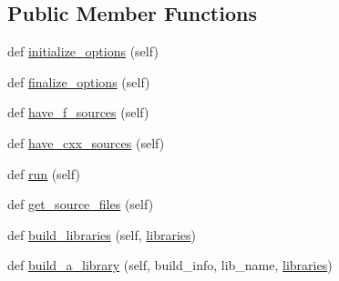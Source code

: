 \subsection*{Public Member Functions}
\begin{DoxyCompactItemize}
\item 
def \hyperlink{classnumpy_1_1distutils_1_1command_1_1build__clib_1_1build__clib_a8d47e29698065ed23a5546e06f7e142c}{initialize\+\_\+options} (self)
\item 
def \hyperlink{classnumpy_1_1distutils_1_1command_1_1build__clib_1_1build__clib_a68ebd0021cfc302004eefb0263ce0e6e}{finalize\+\_\+options} (self)
\item 
def \hyperlink{classnumpy_1_1distutils_1_1command_1_1build__clib_1_1build__clib_adbda3c517e78a3f0993920bbc616e2dc}{have\+\_\+f\+\_\+sources} (self)
\item 
def \hyperlink{classnumpy_1_1distutils_1_1command_1_1build__clib_1_1build__clib_aebd27fe641ebf1de97aad86ab248a06a}{have\+\_\+cxx\+\_\+sources} (self)
\item 
def \hyperlink{classnumpy_1_1distutils_1_1command_1_1build__clib_1_1build__clib_a1370c353757bcf2cb3f5772e6c0fd934}{run} (self)
\item 
def \hyperlink{classnumpy_1_1distutils_1_1command_1_1build__clib_1_1build__clib_a284216b1fd6c65ee733a8a9b62746aab}{get\+\_\+source\+\_\+files} (self)
\item 
def \hyperlink{classnumpy_1_1distutils_1_1command_1_1build__clib_1_1build__clib_a62b2694fa02ea686bcd4c1aa0e0a501a}{build\+\_\+libraries} (self, \hyperlink{classnumpy_1_1distutils_1_1command_1_1build__clib_1_1build__clib_a6c29974db326349933a664df53ff9630}{libraries})
\item 
def \hyperlink{classnumpy_1_1distutils_1_1command_1_1build__clib_1_1build__clib_a750cc99fb7058c5c325f6c4d203a27ce}{build\+\_\+a\+\_\+library} (self, build\+\_\+info, lib\+\_\+name, \hyperlink{classnumpy_1_1distutils_1_1command_1_1build__clib_1_1build__clib_a6c29974db326349933a664df53ff9630}{libraries})
\end{DoxyCompactItemize}
